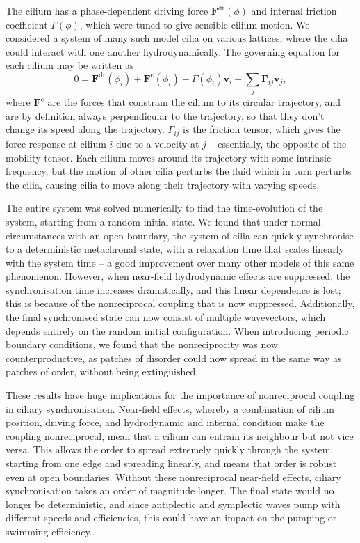The cilium has a phase-dependent driving force $\mathbf{F}^\text{dr}(\phi)$ and internal friction coefficient $\Gamma(\phi)$, which were tuned to give sensible cilium motion. We considered a system of many such model cilia on various lattices, where the cilia could interact with one another hydrodynamically. The governing equation for each cilium may be written as
\begin{equation}
    0 = \mathbf{F}^\text{dr}(\phi_i) + \mathbf{F}^\text{c}(\phi_i) - \Gamma(\phi_i)\mathbf{v}_i - \sum_j \mathbf{\Gamma}_{ij} \mathbf{v}_j,
\end{equation}
where $\mathbf{F}^\text{c}$ are the forces that constrain the cilium to its circular trajectory, and are by definition always perpendicular to the trajectory, so that they don't change its speed along the trajectory. $\Gamma_{ij}$ is the friction tensor, which gives the force response at cilium $i$ due to a velocity at $j$ -- essentially, the opposite of the mobility tensor. Each cilium moves around its trajectory with some intrinsic frequency, but the motion of other cilia perturbs the fluid which in turn perturbs the cilia, causing cilia to move along their trajectory with varying speeds.

The entire system was solved numerically to find the time-evolution of the system, starting from a random initial state. We found that under normal circumstances with an open boundary, the system of cilia can quickly synchronise to a deterministic metachronal state, with a relaxation time that scales linearly with the system time -- a good improvement over many other models of this same phenomenon. However, when near-field hydrodynamic effects are suppressed, the synchronisation time increases dramatically, and this linear dependence is lost; this is because of the nonreciprocal coupling that is now suppressed. Additionally, the final synchronised state can now consist of multiple wavevectors, which depends entirely on the random initial configuration. When introducing periodic boundary conditions, we found that the nonreciprocity was now counterproductive, as patches of disorder could now spread in the same way as patches of order, without being extinguished.

These results have huge implications for the importance of nonreciprocal coupling in ciliary synchronisation. Near-field effects, whereby a combination of cilium position, driving force, and hydrodynamic and internal condition make the coupling nonreciprocal, mean that a cilium can entrain its neighbour but not vice versa. This allows the order to spread extremely quickly through the system, starting from one edge and spreading linearly, and means that order is robust even at open boundaries. Without these nonreciprocal near-field effects, ciliary synchronisation takes an order of magnitude longer. The final state would no longer be deterministic, and since antiplectic and symplectic waves pump with different speeds and efficiencies, this could have an impact on the pumping or swimming efficiency.

